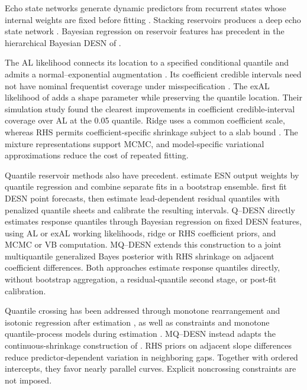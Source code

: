 Echo state networks generate dynamic predictors from recurrent states whose
internal weights are fixed before fitting
\citep{qdesn-Jaeger2001EchoState,qdesn-LukoseviciusJaeger2009ReservoirComputing}.
Stacking reservoirs produces a deep echo state network
\citep{qdesn-GallicchioMicheliPedrelli2018DeepESNDesign}. Bayesian regression on
reservoir features has precedent in the hierarchical Bayesian DESN of
\citet{qdesn-McDermottWikle2018DeepESNUQ}.

The AL likelihood connects its location to a specified
conditional quantile and admits a normal--exponential augmentation
\citep{env-yu2001bayesian,qdesn-KozumiKobayashi2011Gibbs}. Its coefficient
credible intervals need not have nominal frequentist coverage under
misspecification \citep{qdesn-YangWangHe2016ALInference}. The exAL likelihood
of \citet{exd-yan2025family} adds a shape parameter while preserving the
quantile location. Their simulation study found the clearest improvements in
coefficient credible-interval coverage over AL at the 0.05 quantile. Ridge
uses a common coefficient scale, whereas RHS permits
coefficient-specific shrinkage subject to a slab bound
\citep{qdesn-CarvalhoPolsonScott2010HS,qdesn-PiironenVehtari2017RHS}. The
mixture representations support MCMC, and model-specific variational
approximations reduce the cost of repeated fitting.

Quantile reservoir methods also have precedent.
\citet{qdesn-LvZhaoLiuWang2016QRESNE} estimate ESN output weights by quantile
regression and combine separate fits in a bootstrap ensemble.
\citet{qdesn-BonasWikleCastruccio2024CalibratedDeepESN} first fit DESN point
forecasts, then estimate lead-dependent residual quantiles with penalized
quantile sheets and calibrate the resulting intervals. Q--DESN directly
estimates response quantiles through Bayesian regression on fixed DESN
features, using AL or exAL working likelihoods, ridge or RHS coefficient
priors, and MCMC or VB computation. MQ--DESN extends this construction to a
joint multiquantile generalized Bayes posterior with RHS shrinkage on adjacent
coefficient differences. Both approaches estimate response quantiles directly,
without bootstrap aggregation, a residual-quantile second stage, or post-fit
calibration.

Quantile crossing has been addressed through monotone rearrangement and
isotonic regression after estimation
\citep{qdesn-BarlowBrunk1972IsotonicDual,exd-chernozhukov2010,qdesn-DeLeonPradoSanso2026HydrologicProducts},
as well as constraints and monotone quantile-process models during estimation
\citep{qdesn-WuLiu2009StepwiseNCQR,qdesn-BondellReichWang2010NoncrossingQR,qdesn-YangTokdar2017JointQuantilePlanes}.
MQ--DESN instead adapts the continuous-shrinkage construction of
\citet{qdesn-KohnsSzendrei2025QVP}. RHS priors on adjacent slope differences
reduce predictor-dependent variation in neighboring gaps. Together with
ordered intercepts, they favor nearly parallel curves. Explicit noncrossing
constraints are not imposed.

